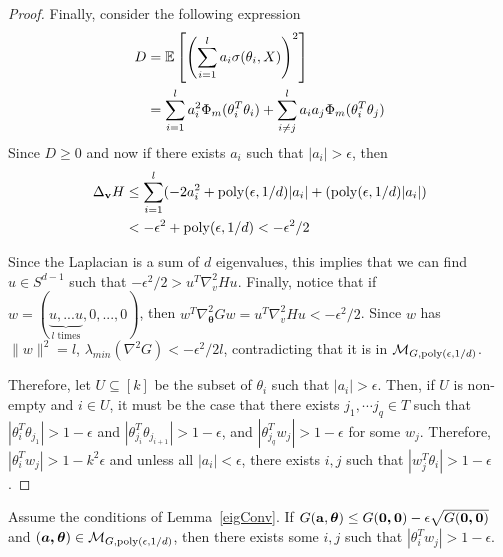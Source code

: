 \begin{proof}
%
Finally, consider the following expression
%
\begin{align*}
D & = \expt\left[\left( \sum_{i=1}^l a_i \sigma(\theta_i,X)\right)^2\right] \\
%
& =\sum_{i=1}^l a_i^2\Phi_m(\theta_i^T\theta_i) + \sum_{i \neq j}^l
  a_ia_j\Phi_m(\theta_i^T\theta_j)
\end{align*}
%
Since $D \geq 0$ and now if there exists $a_i$ such that $|a_i| > \epsilon$, then
%
\begin{align*}
\Delta_{{\bf v}}H & \leq  \sum_{i=1}^l (-2a_i^2 +\mathrm{poly}(\epsilon,1/d) |a_i|+(\mathrm{poly}(\epsilon,1/d)|a_i|) \\
& < -\epsilon^2 + \mathrm{poly}(\epsilon,1/d) < -\epsilon^2/2
\end{align*}

Since the Laplacian is a sum of $d$ eigenvalues, this implies that we can find $u \in S^{d-1}$ such that $-\epsilon^2/2 > u^T\nabla^2_v H u$. Finally, notice that if $w = (\underbrace{u,...u}_{l {\textrm{ times}}},0,...,0)$, then $w^T\nabla^2_{\boldsymbol{\theta}} G w = u^T\nabla^2_v H u < -\epsilon^2/2$. Since $w$ has $\|w\|^2 = l$, $\lambda_{min}(\nabla^2 G) < -\epsilon^2/2l$, contradicting that it is in $\mathcal{M}_{G, \mathrm{poly}(\epsilon,1/d)}$. 

Therefore, let $U \subseteq [k]$ be the subset of $\theta_i$ such that $|a_i|>\epsilon$. Then, if $U$ is non-empty and $i \in U$, it must be the case that there exists ${j_1},\cdots {j_q} \in T$ such that $|\theta_i^T\theta_{j_1}| > 1-\epsilon$ and
$|\theta_{j_{i}}^T\theta_{j_{i+1}}| > 1-\epsilon$, and
$|\theta_{j_q}^Tw_j| > 1-\epsilon$ for some $w_j$. Therefore,
$|\theta_i^Tw_j| > 1- k^2\epsilon$ and unless all $|a_i| <\epsilon$,  there exists $i, j$ such that $|w_j^T\theta_i| > 1-\epsilon$.
\end{proof}

\begin{lemma}\label{eigRes}
  Assume the conditions of Lemma~\ref{eigConv}. If
$G({\bf a, \boldsymbol{\theta}}) \leq G(\boldsymbol{0,0}) - \epsilon\sqrt{G(\boldsymbol{0,0})}$
  and $(\boldsymbol{a,\theta}) \in \mathcal{M}_{G,\mathrm{poly}(\epsilon,1/d)}$,
  then there exists some $i, j$ such that $|\theta_i^Tw_j| > 1- \epsilon$.
\end{lemma}
 
